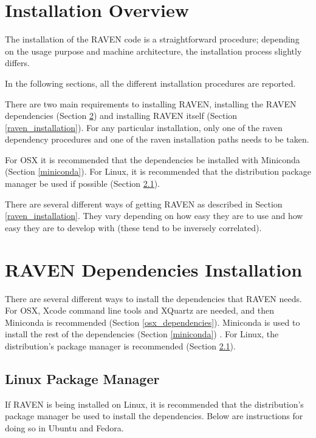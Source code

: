 \section{Installation Overview}

The installation of the RAVEN code is a straightforward procedure;
depending on the usage purpose and machine architecture, the
installation process slightly differs.

In the following sections, all the different installation procedures
are reported.

There are two main requirements to installing RAVEN, installing the
RAVEN dependencies (Section \ref{raven_dependencies}) and installing
RAVEN itself (Section \ref{raven_installation}).  For any particular
installation, only one of the raven dependency procedures and one of
the raven installation paths needs to be taken.

For OSX it is recommended that the dependencies be installed with
Miniconda (Section \ref{miniconda}).  For Linux, it is recommended
that the distribution package manager be used if possible (Section
\ref{linux_package_manager}).

There are several different ways of getting RAVEN as described in
Section \ref{raven_installation}.  They vary depending on how easy
they are to use and how easy they are to develop with (these tend to
be inversely correlated).

\newcommand{\goToRavenInstallation}{Now go on to Section \ref{raven_installation} for Raven installation.
}


\section{RAVEN Dependencies Installation}
\label{raven_dependencies}

There are several different ways to install the dependencies that
RAVEN needs.  For OSX, Xcode command line tools and XQuartz are
needed, and then Miniconda is recommended (Section
\ref{osx_dependencies}).  Miniconda is used to install the rest of the
dependencies (Section \ref{miniconda}) .  For Linux, the
distribution's package manager is recommended (Section
\ref{linux_package_manager}).

\subsection{Linux Package Manager}
\label{linux_package_manager}

If RAVEN is being installed on Linux, it is recommended that the
distribution's package manager be used to install the dependencies.
Below are instructions for doing so in Ubuntu and Fedora.

